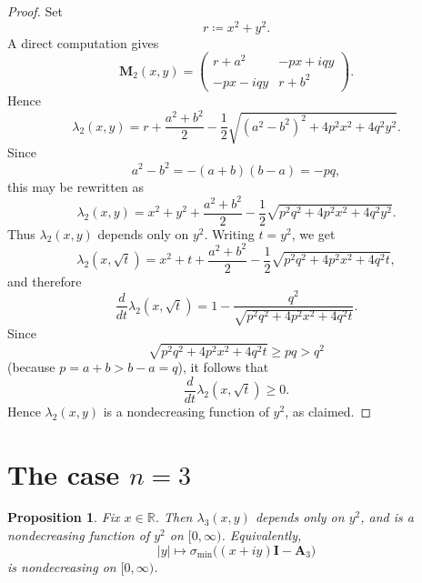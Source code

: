 \documentclass[11pt]{article}
\newtheorem{proposition}[theorem]{Proposition}
\newcommand{\R}{\mathbb{R}}
\begin{document}
\begin{proof}
Set
\[
r\coloneqq x^2+y^2.
\]
A direct computation gives
\[
\mathbf M_2(x,y)
=
\begin{pmatrix}
r+a^2 & -px+iqy\\
-px-iqy & r+b^2
\end{pmatrix}.
\]
Hence
\[
\lambda_2(x,y)
=
r+\frac{a^2+b^2}{2}
-\frac12\sqrt{(a^2-b^2)^2+4p^2x^2+4q^2y^2}.
\]
Since
\[
a^2-b^2=-(a+b)(b-a)=-pq,
\]
this may be rewritten as
\[
\lambda_2(x,y)
=
x^2+y^2+\frac{a^2+b^2}{2}
-\frac12\sqrt{p^2q^2+4p^2x^2+4q^2y^2}.
\]
Thus \(\lambda_2(x,y)\) depends only on \(y^2\). Writing \(t=y^2\), we get
\[
\lambda_2(x,\sqrt t)
=
x^2+t+\frac{a^2+b^2}{2}
-\frac12\sqrt{p^2q^2+4p^2x^2+4q^2t},
\]
and therefore
\[
\frac{d}{dt}\lambda_2(x,\sqrt t)
=
1-\frac{q^2}{\sqrt{p^2q^2+4p^2x^2+4q^2t}}.
\]
Since
\[
\sqrt{p^2q^2+4p^2x^2+4q^2t}\ge pq>q^2
\]
(because \(p=a+b>b-a=q\)), it follows that
\[
\frac{d}{dt}\lambda_2(x,\sqrt t)\ge 0.
\]
Hence \(\lambda_2(x,y)\) is a nondecreasing function of \(y^2\), as claimed.
\end{proof}

\section{The case \(n=3\)}

\begin{proposition}\label{prop:n3}
Fix \(x\in\R\). Then \(\lambda_3(x,y)\) depends only on \(y^2\), and is a nondecreasing function
of \(y^2\) on \([0,\infty)\). Equivalently,
\[
|y|\longmapsto \sigma_{\min}\!\bigl((x+iy)\mathbf I-\mathbf A_3\bigr)
\]
is nondecreasing on \([0,\infty)\).
\end{proposition}
\end{document}
